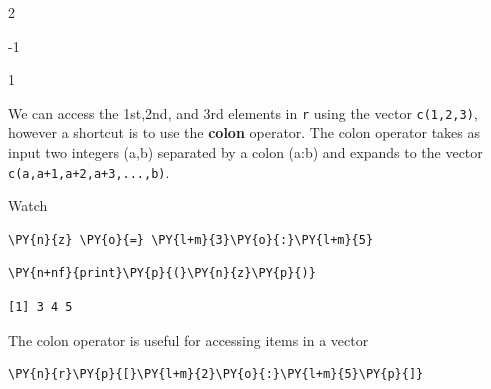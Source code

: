     \begin{enumerate*}
\item 2
\item -1
\item 1
\end{enumerate*}


    
    We can access the 1st,2nd, and 3rd elements in \texttt{r} using the
vector \texttt{c(1,2,3)}, however a shortcut is to use the
\textbf{colon} operator. The colon operator takes as input two integers
(a,b) separated by a colon (a:b) and expands to the vector
\texttt{c(a,a+1,a+2,a+3,...,b)}.

Watch

    \begin{tcolorbox}[breakable, size=fbox, boxrule=1pt, pad at break*=1mm,colback=cellbackground, colframe=cellborder]
\begin{Verbatim}[commandchars=\\\{\}]
\PY{n}{z} \PY{o}{=} \PY{l+m}{3}\PY{o}{:}\PY{l+m}{5}
\end{Verbatim}
\end{tcolorbox}

    \begin{tcolorbox}[breakable, size=fbox, boxrule=1pt, pad at break*=1mm,colback=cellbackground, colframe=cellborder]
\begin{Verbatim}[commandchars=\\\{\}]
\PY{n+nf}{print}\PY{p}{(}\PY{n}{z}\PY{p}{)}
\end{Verbatim}
\end{tcolorbox}

    \begin{Verbatim}[commandchars=\\\{\}]
[1] 3 4 5
    \end{Verbatim}

    The colon operator is useful for accessing items in a vector

    \begin{tcolorbox}[breakable, size=fbox, boxrule=1pt, pad at break*=1mm,colback=cellbackground, colframe=cellborder]
\begin{Verbatim}[commandchars=\\\{\}]
\PY{n}{r}\PY{p}{[}\PY{l+m}{2}\PY{o}{:}\PY{l+m}{5}\PY{p}{]}
\end{Verbatim}
\end{tcolorbox}

